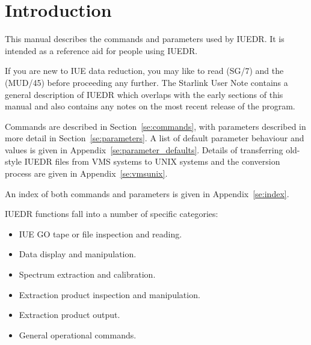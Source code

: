 \begin{latexonly}
   \setlength{\parskip}{0mm}
   \latexonlytoc
   \setlength{\parskip}{\medskipamount}
   \markright{\stardocname}
\end{latexonly}

\newpage
\renewcommand{\thepage}{\arabic{page}}
\setcounter{page}{1}
\section{\label{se:introduction}Introduction }

This manual describes the commands and parameters used by IUEDR\@.
It is intended as a reference aid for people using IUEDR\@.

If you are new to IUE data reduction, you may like to read
 (SG/7) and the
 (MUD/45) before proceeding
any further.
The Starlink User Note  contains a general description
of IUEDR which
overlaps with the early sections of this manual and also contains any notes on
the most recent release of the program.

Commands are described in Section~\ref{se:commands}, with parameters described
in more detail in Section~\ref{se:parameters}\@.
A list of default parameter behaviour and values is given in
Appendix~\ref{se:parameter_defaults}\@.
Details of transferring old-style IUEDR files from VMS systems to UNIX systems
and the conversion process are given in Appendix~\ref{se:vmsunix}\@.

\begin{latexonly}
An index of both commands and parameters is given in Appendix~\ref{se:index}\@.
\end{latexonly}

IUEDR functions fall into a number of specific categories:

\begin {itemize}
   \item IUE GO tape or file inspection and reading.
   \item Data display and manipulation.
   \item Spectrum extraction and calibration.
   \item Extraction product inspection and manipulation.
   \item Extraction product output.
   \item General operational commands.
\end {itemize}

